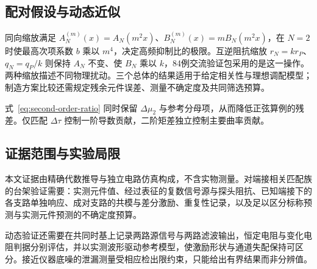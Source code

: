\subsection{配对假设与动态近似}

同向缩放满足 $A_N^{(m)}(x)=A_N(m^2x)$、$B_N^{(m)}(x)=mB_N(m^2x)$，在 $N=2$ 时使最高次项系数 $b$ 乘以 $m^4$，决定高频抑制比的极限。互逆阻抗缩放 $r_N=kr_P$、$q_N=q_P/k$ 则保持 $A_N$ 不变、使 $B_N$ 乘以 $k$，84例交流验证包采用的是这一操作。两种缩放描述不同物理扰动。三个总体的结果适用于给定相关性与理想调配模型；制造方案比较还需规定残余元件误差、测量不确定度及共同筛选预算。

式~\eqref{eq:second-order-ratio} 同时保留 $\Delta\mu_2$ 与参考分母项，从而降低正弦算例的残差。仅匹配 $\Delta\tau$ 控制一阶导数贡献，二阶矩差独立控制主要曲率贡献。


\subsection{证据范围与实验局限}

本文证据由精确代数推导与独立电路仿真构成，不含实物测量。对端接相关匹配族的台架验证需要：实测元件值、经过表征的复数信号源与探头阻抗、已知端接下的各支路单独响应、成对支路的共模与差分激励、重复性记录，以及足以区分标称预测与实测元件预测的不确定度预算。

动态验证还需要在共同时基上记录两路源信号与两路滤波输出，恒定电阻与变化电阻判据分别评估，并以实测波形驱动参考模型，使激励形状与通道失配保持可区分。接近仪器底噪的泄漏测量受相应检出限约束，只能给出有界结果而非分辨值。
